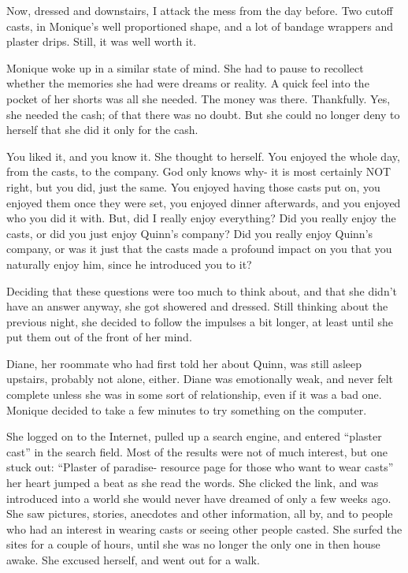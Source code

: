 Now, dressed and downstairs, I attack the mess from the day before. Two cutoff casts, in
Monique's well proportioned shape, and a lot of bandage wrappers and plaster drips. Still, it
was well worth it.

Monique woke up in a similar state of mind. She had to pause to recollect whether the
memories she had were dreams or reality. A quick feel into the pocket of her shorts was all she
needed. The money was there. Thankfully. Yes, she needed the cash; of that there was no doubt.
But she could no longer deny to herself that she did it only for the cash.

You liked it, and you know it. She thought to herself. You enjoyed the whole day, from the
casts, to the company. God only knows why- it is most certainly NOT right, but you did, just the
same. You enjoyed having those casts put on, you enjoyed them once they were set, you enjoyed
dinner afterwards, and you enjoyed who you did it with. But, did I really enjoy everything? Did
you really enjoy the casts, or did you just enjoy Quinn's company? Did you really enjoy Quinn's
company, or was it just that the casts made a profound impact on you that you naturally enjoy
him, since he introduced you to it?

Deciding that these questions were too much to think about, and that she didn't have an
answer anyway, she got showered and dressed. Still thinking about the previous night, she
decided to follow the impulses a bit longer, at least until she put them out of the front of her
mind.

Diane, her roommate who had first told her about Quinn, was still asleep upstairs, probably
not alone, either. Diane was emotionally weak, and never felt complete unless she was in some
sort of relationship, even if it was a bad one. Monique decided to take a few minutes to try
something on the computer.

She logged on to the Internet, pulled up a search engine, and entered ``plaster cast'' in the
search field. Most of the results were not of much interest, but one stuck out: ``Plaster of
paradise- resource page for those who want to wear casts'' her heart jumped a beat as she read
the words. She clicked the link, and was introduced into a world she would never have dreamed of
only a few weeks ago. She saw pictures, stories, anecdotes and other information, all by, and to
people who had an interest in wearing casts or seeing other people casted. She surfed the sites
for a couple of hours, until she was no longer the only one in then house awake. She excused
herself, and went out for a walk.

